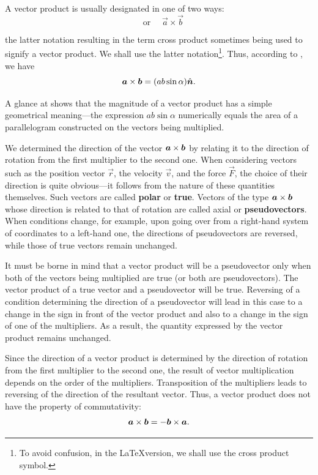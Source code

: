 A vector product is usually designated in one of two ways:
\begin{equation*}
[\vec{a},\vec{b}]\quad\text{or }\quad \vec{a}\times\vec{b}
\end{equation*}

\noindent
the latter notation resulting in the term cross product sometimes being used to signify a vector product. We shall use the latter notation\footnote{To avoid confusion, in the \LaTeX version, we shall use the cross product symbol.}. Thus, according to , we have
\begin{equation}\label{eq:1_28}
\boldsymbol{a}\times\boldsymbol{b} = (ab\sin\alpha)\hat{\boldsymbol{n}}.
\end{equation}

A glance at  shows that the magnitude of a vector product has a simple geometrical meaning---the expression $ab\sin\alpha$ numerically equals the area of a parallelogram constructed on the vectors being multiplied.

We determined the direction of the vector $\boldsymbol{a}\times\boldsymbol{b}$ by relating it to the direction of rotation from the first multiplier to the second one. When considering vectors such as the position vector $\vec{r}$, the velocity $\vec{v}$, and the force $\vec{F}$, the choice of their direction is quite obvious---it follows from the nature of these quantities themselves. Such vectors are called \textbf{polar} or \textbf{true}. Vectors of the type $\boldsymbol{a}\times\boldsymbol{b}$ whose direction is related to that of rotation are called axial or \textbf{pseudovectors}. When conditions change, for example, upon going over from a right-hand system of coordinates to a left-hand one, the directions of pseudovectors are reversed, while those of true vectors remain unchanged.

It must be borne in mind that a vector product will be a pseudovector only when both of the vectors being multiplied are true (or both are pseudovectors). The vector product of a true vector and a pseudovector will be true. Reversing of a condition determining the direction of a pseudovector will lead in this case to a change in the sign in front of the vector product and also to a change in the sign of one of the multipliers. As a result, the quantity expressed
by the vector product remains unchanged.

Since the direction of a vector product is determined by the direction of rotation from the first multiplier to the second one, the result of vector multiplication depends on the order of the multipliers. Transposition of the multipliers leads to reversing of the direction of the resultant vector. Thus, a vector product does not have the property of commutativity:
\begin{equation}\label{eq:1_29}
\boldsymbol{a}\times\boldsymbol{b} = -\boldsymbol{b}\times\boldsymbol{a}.
\end{equation}

